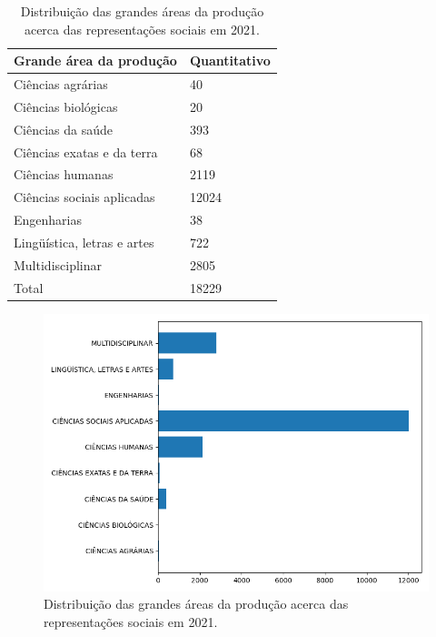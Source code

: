 \documentclass[
   article,       %
   11pt,          %
   oneside,       %
   a4paper,       %
   english,       %
   brazil,           %
   sumario=tradicional
   ]{abntex2}
\begin{document}
\begin{table}[htb]
\centering
\caption{Distribuição das grandes áreas da produção acerca das representações sociais em 2021.}
\label{tab-nivinv}
\begin{tabular}{p{6.0cm}|p{6.0cm}}
   \textbf{Grande área da produção} & \textbf{Quantitativo} \\
    \hline
    Ciências agrárias & 40 \\
    \hline
    Ciências biológicas & 20 \\
    \hline
    Ciências da saúde & 393 \\
    \hline
    Ciências exatas e da terra & 68 \\
    \hline
    Ciências humanas & 2119 \\
    \hline
    Ciências sociais aplicadas & 12024 \\
    \hline
    Engenharias & 38 \\
    \hline
    Lingüística, letras e artes & 722 \\
    \hline
    Multidisciplinar & 2805 \\
    \hline
    \hline
    Total & 18229
\end{tabular}
\end{table}

\begin{figure}
   \caption{Distribuição das grandes áreas da produção acerca das representações sociais em 2021.}
   \begin{center}
       \includegraphics[width=120mm,scale=1]{est_con_2021.png}
   \end{center}
\end{figure}
\end{document}
